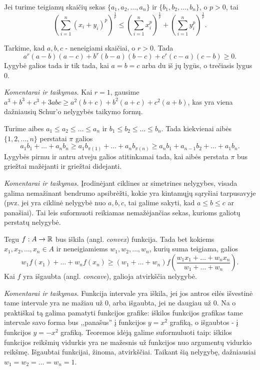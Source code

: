 \begin{thm}[Minkowski]
  Jei turime teigiamų skaičių sekas $\{a_1,a_2,\ldots,a_n\}$ ir
  $\{b_1,b_2,\ldots,b_n\}$, o $p>0$, tai
  $$\left(\sum_{i=1}^{n}{(x_i+y_i)^p}\right)^{\frac{1}{p}}\leq\left(\sum_{i=1}^{n}{x_i^p}\right)^{\frac{1}{p}}+\left(\sum_{i=1}^{n}{y_i^p}\right)^{\frac{1}{p}}.$$
\end{thm}

\begin{thm}[Schur]
  Tarkime, kad $a,b,c$ - neneigiami skaičiai, o $r>0$. Tada
  $$a^r(a-b)(a-c)+b^r(b-a)(b-c)+c^r(c-a)(c-b)\geq0.$$ Lygybė galios tada ir
  tik tada, kai $a=b=c$ arba du iš jų lygūs, o trečiasis lygus 0.
\end{thm}

\noindent \textit{Komentarai ir taikymas.} Kai $r=1$, gausime
$a^3+b^3+c^3+3abc\geq a^2(b+c)+b^2(a+c)+c^2(a+b)$, kas yra viena dažniausių
Schur'o nelygybės taikymo formų.

\begin{thm}
  Turime aibes $a_1\leq a_2\leq\ldots\leq a_n$ ir $b_1\leq b_2\leq\ldots\leq
  b_n$. Tada kiekvienai aibės $\{1,2,\ldots,n\}$ perstatai
  $\pi$ galios $$a_1b_1+\ldots+a_nb_n\geq
  a_1b_{\pi(1)}+\ldots+a_nb_{\pi(n)}\geq a_nb_1+a_{n-1}b_2+\ldots+a_1b_n.$$
  Lygybės pirmu ir antru atveju galios atitinkamai tada, kai aibės perstata
  $\pi$ bus griežtai mažėjanti ir griežtai didejanti.
\end{thm}

\noindent \textit{Komentarai ir taikymas.} Įrodinėjant ciklines ar
simetrines nelygybes, visada galima nemažinant bendrumo apsibrėžti, kokie
yra kintamųjų sąryšiai tarpusavyje (pvz. jei yra ciklinė nelygybė nuo
$a,b,c$, tai galime sakyti, kad $a\leq b\leq c$ ar panašiai). Tai leis
suformuoti reikiamas nemažėjančias sekas, kurioms galiotų perstatų
nelygybė.

\begin{thm}[Jensen]
  Tegu $f:A\rightarrow\mathbb R$ bus iškila (angl. \textit{convex}) funkcija. Tada
  bet kokiems $x_1,x_2,\ldots,x_n\in A$ ir neneigiamiems
  $w_1,w_2,\ldots,w_n$, kurių suma teigiama, galios
  $$w_1f(x_1)+\ldots+w_nf(x_n)\geq(w_1+\ldots+w_n)f\left(\frac{w_1x_1+\ldots+w_nx_n}{w_1+\ldots+w_n}\right).$$
  Kai $f$ yra išgaubta (angl. \textit{concave}), galioja atvirkščia
  nelygybė.
\end{thm}

\noindent \textit{Komentarai ir taikymas.} Funkcija intervale yra iškila,
jei jos antros eilės išvestinė tame intervale yra ne mažiau už $0$, arba
išgaubta, jei ne daugiau už $0$. Na o praktiškai tą galima pamatyti
funkcijos grafike: iškilos funkcijos grafikas tame intervale savo forma bus
,,panašus'' į funkcijos $y=x^2$ grafiką, o išgaubtos - į funkcijos $y=-x^2$
grafiką. Teoremos idėją galime suformuluoti taip: iškilos funkcijos
reikšmių vidurkis yra ne mažesnis už funkcijos nuo argumentų vidurkio
reikšmę.  Išgaubtai funkcijai, žinoma, atvirkščiai. Taikant šią nelygybę,
dažniausiai $w_1=w_2=\ldots=w_n=1$.

